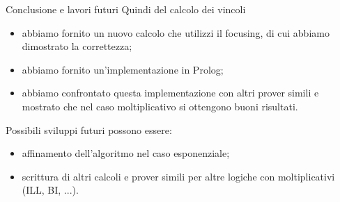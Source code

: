 \documentclass{beamer}
\begin{document}
\begin{frame}{Conclusione e lavori futuri}
	Quindi del calcolo dei vincoli
	\begin{itemize}
		\item abbiamo fornito un nuovo calcolo che utilizzi il focusing, di cui abbiamo dimostrato la correttezza;
		\item abbiamo fornito un'implementazione in Prolog;
		\item abbiamo confrontato questa implementazione con altri prover simili e mostrato che nel caso moltiplicativo si ottengono buoni risultati.
	\end{itemize}
  	Possibili sviluppi futuri possono essere:
	\begin{itemize}
		\item affinamento dell'algoritmo nel caso esponenziale;
		\item scrittura di altri calcoli e prover simili per altre logiche con moltiplicativi (ILL, BI, ...).
	\end{itemize}
\end{frame}

\backmatter[notitle]
\end{document}
